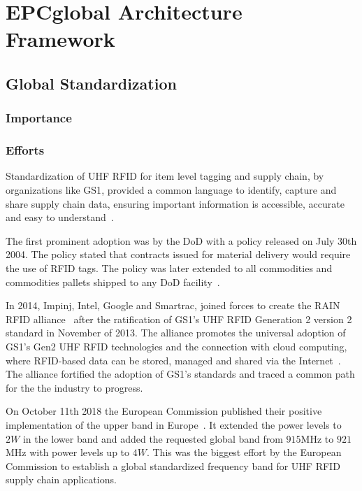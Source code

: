 \section{EPCglobal Architecture Framework}

\subsection{Global Standardization}

\subsubsection{Importance}


\subsubsection{Efforts}

Standardization of \gls{UHF RFID} for item level tagging and \gls{supply chain}, by organizations like \gls{GS1}, provided a common language to identify, capture and share supply chain data, ensuring important information is accessible, accurate and easy to understand~\cite{anonymousStandardsGS12014}.

The first prominent adoption was by the \gls{DoD} with a policy released on July 30th 2004. The policy stated that contracts issued for material delivery would require the use of RFID tags. The policy was later extended to all commodities and commodities pallets shipped to any \gls{DoD} facility~\cite{DoDSuppliersPassive, DODReleasesFinal}.

In 2014, Impinj, Intel, Google and Smartrac, joined forces to create the \gls{RAIN RFID} alliance~\cite{TechnologyCompaniesCreate} after the ratification of \gls{GS1}'s \gls{UHF RFID} Generation 2 version 2 standard in November of 2013. The alliance promotes the universal adoption of \gls{GS1}'s Gen2 \gls{UHF RFID} technologies and the connection with \gls{cloud computing}, where RFID-based data can be stored, managed and shared via the Internet~\cite{WhatRAINRFID}.
The alliance fortified the adoption of \gls{GS1}'s standards and traced a common path for the the industry to progress.

On October 11th 2018 the European Commission published their positive implementation of the upper band in Europe~\cite{302208v030101pPdf}.
It extended the power levels to $2W$ in the lower band and added the requested global band from $915$MHz to $921$MHz with power levels up to $4W$. 
This was the biggest effort by the European Commission to establish a global standardized frequency band for \gls{UHF RFID} \gls{supply chain} applications.

